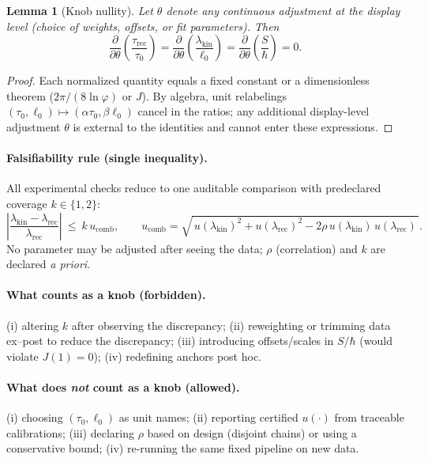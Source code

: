 \documentclass[11pt]{article}
\theoremstyle{plain}
\newtheorem{lemma}{Lemma}
\theoremstyle{definition}
\theoremstyle{remark}
\begin{document}
\begin{lemma}[Knob nullity]
Let \(\theta\) denote any continuous adjustment at the display level (choice of weights, offsets, or fit parameters). Then
\[
\frac{\partial}{\partial\theta}\left(\frac{\tau_{\mathrm{rec}}}{\tau_{0}}\right)
=
\frac{\partial}{\partial\theta}\left(\frac{\lambda_{\mathrm{kin}}}{\ell_{0}}\right)
=
\frac{\partial}{\partial\theta}\left(\frac{S}{\hbar}\right)
=0.
\]
\end{lemma}

\begin{proof}
Each normalized quantity equals a fixed constant or a dimensionless theorem (\(2\pi/(8\ln\varphi)\) or \(J\)). By algebra, unit relabelings \((\tau_{0},\ell_{0})\mapsto(\alpha\tau_{0},\beta\ell_{0})\) cancel in the ratios; any additional display-level adjustment \(\theta\) is external to the identities and cannot enter these expressions.
\end{proof}

\paragraph{Falsifiability rule (single inequality).}
All experimental checks reduce to one auditable comparison with predeclared coverage \(k\in\{1,2\}\):
\[
\left|\frac{\lambda_{\mathrm{kin}}-\lambda_{\mathrm{rec}}}{\lambda_{\mathrm{rec}}}\right|
\ \le\ 
k\,u_{\mathrm{comb}},
\qquad
u_{\mathrm{comb}}=\sqrt{\,u(\lambda_{\mathrm{kin}})^{2}+u(\lambda_{\mathrm{rec}})^{2}-2\rho\,u(\lambda_{\mathrm{kin}})\,u(\lambda_{\mathrm{rec}})\,}.
\]
No parameter may be adjusted after seeing the data; \(\rho\) (correlation) and \(k\) are declared \emph{a priori}.

\paragraph{What counts as a knob (forbidden).}
(i) altering \(k\) after observing the discrepancy; (ii) reweighting or trimming data ex–post to reduce the discrepancy; (iii) introducing offsets/scales in \(S/\hbar\) (would violate \(J(1)=0\)); (iv) redefining anchors post hoc.

\paragraph{What does \emph{not} count as a knob (allowed).}
(i) choosing \((\tau_{0},\ell_{0})\) as unit names; (ii) reporting certified \(u(\cdot)\) from traceable calibrations; (iii) declaring \(\rho\) based on design (disjoint chains) or using a conservative bound; (iv) re-running the same fixed pipeline on new data.
\end{document}
